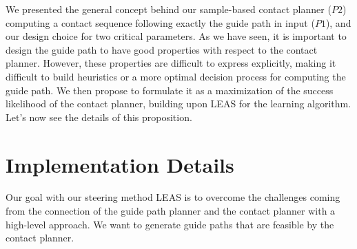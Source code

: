 \hfill

We presented the general concept behind our sample-based contact planner ($P2$) computing a contact sequence following exactly the guide path in input ($P1$), and our design choice for two critical parameters.
As we have seen, it is important to design the guide path to have good properties with respect to the contact planner. 
However, these properties are difficult to express explicitly, making it difficult to build heuristics or a more optimal decision process for computing the guide path. 
We then propose to formulate it as a maximization of the success likelihood of the contact planner, building upon LEAS for the learning algorithm. Let's now see the details of this proposition.


\section{Implementation Details\label{sub:cp-sb:leas_coupling}}

Our goal with our steering method LEAS is to overcome the challenges coming from the connection of the guide path planner and the contact planner with a high-level approach.
We want to generate guide paths that are feasible by the contact planner.

